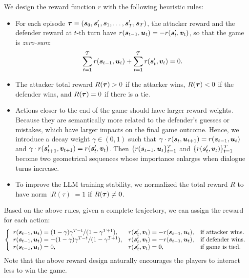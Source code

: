 \documentclass{article}
\theoremstyle{plain}
\theoremstyle{definition}
\theoremstyle{remark}
\begin{document}
 
 We design the reward function $r$ with the following heuristic rules: 
 \begin{itemize}[leftmargin=14pt]
    \item   For each episode $\bm{\tau} = ({\bm{s}}_0, {\bm{s}}'_1, {\bm{s}}_1, \dots, {\bm{s}}'_T, {\bm{s}}_T)$, the attacker reward and the defender reward at $t$-th turn have $r({\bm{s}}_{t-1}, {\bm{u}}_t) = - r({\bm{s}}'_{t}, {\bm{v}}_t)$, so that the game is \textit{zero-sum}: $$\sum_{t=1}^T r({\bm{s}}_{t-1}, {\bm{u}}_t) + \sum_{t=1}^T r({\bm{s}}'_{t}, {\bm{v}}_t) = 0.$$
    
     \item  The attacker total reward $R(\bm{\tau}) >0 $  if the  attacker wins, $R(\bm{\tau}) <0 $ if the defender wins, and $R(\bm{\tau})=0$ if there is a tie.
     
     \item Actions closer to the end of the game should have larger reward weights. Because they are semantically more related to the defender's guesses or mistakes, which have larger impacts on the final game outcome. Hence, we introduce a decay weight $\gamma \in (0,1)$ such that $\gamma \cdot r({\bm{s}}_{t}, {\bm{u}}_{t+1}) = r({\bm{s}}_{t-1}, {\bm{u}}_{t}) $ and $\gamma \cdot r({\bm{s}}'_{t+1}, {\bm{v}}_{t+1}) = r({\bm{s}}'_{t}, {\bm{v}}_{t})$. Then $\{r({\bm{s}}_{t-1}, {\bm{u}}_t\}_{t=1}^T$ and $\{r({\bm{s}}'_{t},{\bm{v}}_t)\}_{t=1}^T$ become two geometrical sequences whose importance enlarges when dialogue turns increase.
     \item To improve the LLM training stability, we normalized the total reward $R$ to have norm $|R(\tau)|=1$ if $R(\bm{\tau}) \neq 0$.
 \end{itemize}
 
 Based on the above rules, given a complete trajectory, we can assign the reward for each action: 
     \begin{equation*}
     \left\{
     \begin{array}{lll}
         r({\bm{s}}_{t-1},{\bm{u}}_t) = (1-\gamma)\gamma^{T-t} / (1-\gamma^{T+1}), & r({\bm{s}}'_{t}, {\bm{v}}_t) = - r({\bm{s}}_{t-1},{\bm{u}}_t),  & \text{if attacker wins.} \\
        r({\bm{s}}_{t-1},{\bm{u}}_t) = - (1-\gamma)\gamma^{T-t}/(1-\gamma^{T+1}), & r({\bm{s}}'_{t}, {\bm{v}}_t) = - r({\bm{s}}_{t-1}, {\bm{u}}_t),    & \text{if defender wins.} \\
        r({\bm{s}}_{t-1},{\bm{u}}_t) = 0, & r({\bm{s}}'_{t}, {\bm{v}}_t) = 0, & \text{if game is tied.}
     \end{array}         
         \right.
     \end{equation*}
Note that the above reward design
naturally encourages the players to interact less to win the game. %
\end{document}
